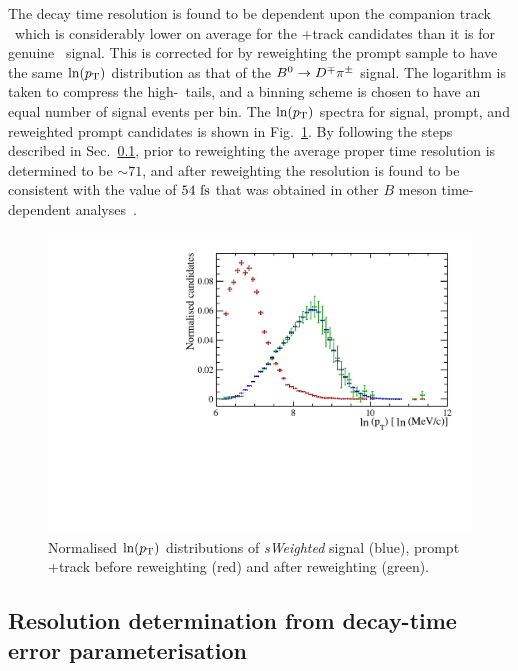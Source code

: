 The decay time resolution is found to be dependent upon the companion track \pt~which is considerably lower on average for the \Dmp+track candidates than it is for genuine \Bz\to\Dmp\pipm~signal. This is corrected for by reweighting the prompt sample to have the same $\ln(\mbox{$p_{\rm T}$})$ distribution as that of the $B^0\rightarrow D^\mp\pi^\pm$ signal. The logarithm is taken to compress the high-\pt~tails, and a binning scheme is chosen to have an equal number of signal events per bin. The $\ln(\mbox{$p_{\rm T}$})$ spectra for signal, prompt, and reweighted prompt candidates is shown in Fig.~\ref{fig:reweights}. By following the steps described in Sec.~\ref{sec:resolution}, prior to reweighting the average proper time resolution is determined to be $\sim71$\fs, and after reweighting the resolution is found to be consistent with the value of $54~\rm fs$ that was obtained in other $B$ meson time-dependent analyses~\cite{LHCB-PAPER-2014-051}.  
\begin{figure}[t]
	\begin{center}
		\includegraphics[width=0.60\linewidth]{05DecaytimeFit/figs/resolution/reweighting.pdf}
	\end{center}
        \vspace{-2mm}
			      \caption{Normalised $\ln(\mbox{$p_{\rm T}$})$ distributions of \emph{sWeighted} \Bz\to\Dmp\pipm signal (blue), prompt \Dmp+track before reweighting (red) and after reweighting (green).
				  \label{fig:reweights}}
\end{figure}

\subsection{Resolution determination from decay-time error parameterisation}
\label{sec:resolution}

